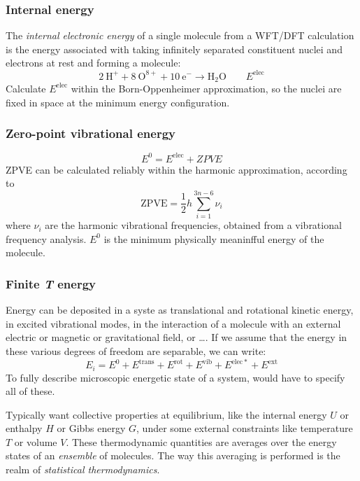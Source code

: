 \documentclass[11pt]{article}
\begin{document}
\subsubsection{Internal energy}
\label{sec:orgc3a2814}
The \emph{internal electronic energy} of a single molecule from a WFT/DFT calculation is the energy
associated with taking infinitely separated constituent nuclei and electrons at
rest and forming a molecule:
\begin{equation}
2~\mathrm{H}^+ + 8~\mathrm{O}^{8+} + 10~\mathrm{e}^- \rightarrow
\mathrm{H_2O}\qquad E^\mathrm{elec}
\end{equation}
Calculate \(E^\mathrm{elec}\)  within the Born-Oppenheimer
approximation, so the nuclei are fixed in space
at the minimum energy configuration.  
\subsubsection{Zero-point vibrational energy}
\label{sec:orgec53d59}
\begin{equation}
  E^0=E^\mathrm{elec} + ZPVE
\end{equation}
ZPVE can be calculated reliably within the harmonic approximation, according to
\begin{equation}
  \mathrm{ZPVE}=\frac{1}{2}h\sum_{i=1}^{3n-6}\nu_i
\end{equation}
where \(\nu_i\) are the harmonic vibrational frequencies, obtained from a
vibrational frequency analysis.  \(E^0\) is the minimum physically meaninfful
energy of the molecule.
\subsubsection{Finite \emph{T} energy}
\label{sec:org9cd7e1e}
Energy can be deposited in a syste  as
translational and rotational kinetic energy, in excited vibrational modes, in
the interaction of a molecule with an external electric or magnetic or
gravitational field, or \ldots{}.   If we assume that the energy in these various
degrees of freedom are separable, we can write:
\begin{equation}
  E_i=E^0+E^\mathrm{trans}+E^\mathrm{rot}+E^\mathrm{vib} +E^\mathrm{elec*}+E^\mathrm{ext}
\end{equation}
To fully describe microscopic energetic state of a system, would have to
specify all of these.

Typically want collective properties at equilibrium, like the internal
energy \(U\) or enthalpy \(H\) or Gibbs energy \(G\), under some external
constraints like temperature \(T\) or volume \(V\).  These thermodynamic
quantities are averages over the energy states of an \emph{ensemble} of
molecules.  The way this averaging is performed is the realm of
\emph{statistical thermodynamics}.
\end{document}
